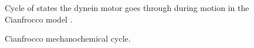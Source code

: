 \documentclass[10pt]{article} %
\begin{document}
\begin{figure}[h!]
  \caption{Cianfrocco mechanochemical cycle.}{Cycle of states the dynein motor goes through during motion in the Cianfrocco model \cite{cianfroccoreview}.}
  \label{mech-cycle}
\end{figure}
\end{document}
